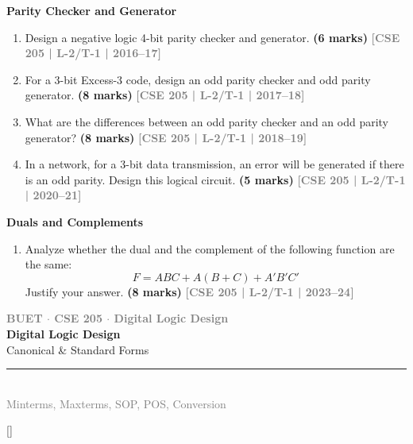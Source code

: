 \documentclass[12pt,a4paper]{article}
\newcommand{\yr}[1]{\hfill\textcolor{gray}{\small\textbf{[#1]}}}
\newcommand{\mk}[1]{\textcolor{orange!70!black}{\small\textbf{(#1 marks)}}}
\newcommand{\subtopic}[2]{%
  \vspace{10pt}
  \noindent\begin{tcolorbox}[colback=#1!8,colframe=#1,boxrule=0.6pt,arc=4pt,
    left=6pt,right=6pt,top=4pt,bottom=4pt]
    \small\bfseries\textcolor{#1}{#2}
  \end{tcolorbox}
  \vspace{2pt}
}
\newcommand{\secdivider}[4]{%
  \newpage\thispagestyle{empty}%
  \vspace*{\fill}%
  \begin{tcolorbox}[enhanced,colback=#4!7,colframe=#3,boxrule=1.5pt,arc=8pt,
    left=20pt,right=20pt,top=22pt,bottom=22pt,
    shadow={3pt}{-3pt}{0pt}{black!15}]
    \centering
    {\large\textcolor{gray}{\textbf{BUET $\cdot$ CSE 205 $\cdot$ Digital Logic Design}}}\\[8pt]
    {\fontsize{26}{32}\selectfont\bfseries\textcolor{#3}{Digital Logic Design}}\\[6pt]
    {\fontsize{15}{19}\selectfont\textcolor{dgray}{#1}}\\[12pt]
    \textcolor{#3!60}{\rule{0.5\textwidth}{0.5pt}}\\[6pt]
    {\small\textcolor{gray}{#2}}
  \end{tcolorbox}%
  \vspace*{\fill}\newpage%
}
\begin{document}
\subtopic{cA}{Parity Checker and Generator}
\label{sub:s1-parity}

\begin{enumerate}

\item Design a negative logic 4-bit parity checker and generator.
\mk{6} \yr{CSE 205 | L-2/T-1 | 2016--17}

\item For a 3-bit Excess-3 code, design an odd parity checker and odd parity generator.
\mk{8} \yr{CSE 205 | L-2/T-1 | 2017--18}

\item What are the differences between an odd parity checker and an odd parity generator?
\mk{8} \yr{CSE 205 | L-2/T-1 | 2018--19}

\item In a network, for a 3-bit data transmission, an error will be generated if there is an odd parity. Design this logical circuit.
\mk{5} \yr{CSE 205 | L-2/T-1 | 2020--21}

\end{enumerate}

\subtopic{cA}{Duals and Complements}
\label{sub:s1-duals}

\begin{enumerate}

\item Analyze whether the dual and the complement of the following function are the same:
\[ F = ABC + A(B+C) + A'B'C' \]
Justify your answer.
\mk{8} \yr{CSE 205 | L-2/T-1 | 2023--24}

\end{enumerate}


\secdivider{Canonical \& Standard Forms}{Minterms, Maxterms, SOP, POS, Conversion}{cB}{blue}

\label{sec:S2}
\titleformat{\section}{\large\bfseries\color{cB}}{}{0em}{}[\titlerule]
\end{document}

